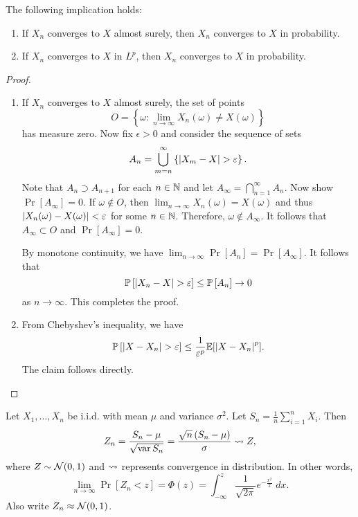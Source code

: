\documentclass[a4paper]{article}
\begin{document}
\begin{thm}
The following implication holds:
\begin{enumerate}
  \item If $X_n$ converges to $X$ almost surely,
  then $X_n$ converges to $X$ in probability.

  \item If $X_n$ converges to $X$ in $L^p$, then
  $X_n$ converges to $X$ in probability.
\end{enumerate}
\end{thm}

\begin{proof}

\begin{enumerate}
  \item If $X_n$ converges to $X$ almost surely,
  the set of points 
  \[
  O = \left\{ \omega : \lim_{n \to \infty}
  X_n(\omega) \neq X(\omega) \right\}
  \]
  has measure zero.
  Now fix $\epsilon > 0$ and consider the sequence of
  sets
  \[
  A_n = \bigcup_{m = n}^\infty \left\{ \left\lvert X_m - X\right\rvert > \varepsilon \right\}.
  \]
  Note that $A_n \supset A_{n+1}$ for each $n \in \mathbb{N}$ and
  let $A_\infty = \bigcap_{n=1}^\infty A_n$.
  Now show $\Pr[A_\infty] = 0$. If $\omega \notin O$, then
  $\lim_{n \to \infty} X_n (\omega) = X(\omega)$ and thus
  $\left\lvert X_n(\omega) - X(\omega)\right\rvert < \varepsilon$ for some $n \in \mathbb{N}$.
  Therefore, $\omega \notin A_\infty$.
  It follows that $A_\infty \subset O$ and $\Pr[A_\infty] = 0$.

  By monotone
  continuity, we have $\lim_{n \to \infty} \Pr[A_n] =
  \Pr[A_\infty]$. It follows that
  \[
  \mathbb{P} \left[ \left\lvert X_n - X\right\rvert > \varepsilon \right]
  \leq \mathbb{P} \left[ A_n \right] \to 0
  \]
  as $n \to \infty$. This completes the proof.

  \item From Chebyshev's inequality, we have
  \[
  \mathbb{P} \left[ \left\lvert X - X_n\right\rvert > \varepsilon \right] \leq
  \frac{1}{\varepsilon^p} \mathbb{E} [\left\lvert X - X_n\right\rvert^p].
  \]
  The claim follows directly.
\end{enumerate}

\end{proof}

\begin{thm}
  Let $X_1, \dots, X_n$ be i.i.d. with mean $\mu$ and variance
  $\sigma^2$. Let $S_n = \frac{1}{n} \sum_{i=1}^n X_i$.
  Then
  \[
  Z_n = \frac{S_n - \mu}{\sqrt{\operatorname{var} S_n}}
  = \frac{\sqrt{n} \left( S_n - \mu \right)}{\sigma}
  \rightsquigarrow Z,
  \]
  where $Z \sim \mathcal{N}(0, 1)$ and $\rightsquigarrow$ represents 
  convergence in distribution. In other words,
  \[
  \lim_{n \to \infty} \Pr[Z_n < z] = \Phi(z)
  = \int_{-\infty}^z \frac{1}{\sqrt{2\pi}} e^{- \frac{x^2}{2}}
  \; dx.
  \]
  Also write $Z_n \approx \mathcal{N}(0, 1)$.
\end{thm}
\end{document}
